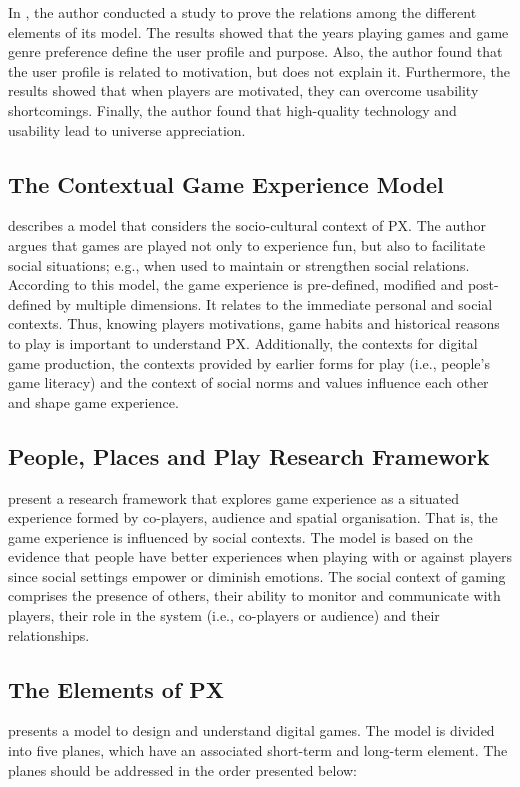 In \autocite{Fernandez}, the author conducted a study to prove the relations among the different elements of its model. The results showed that the years playing games and game genre preference define the user profile and purpose. Also, the author found that the user profile is related to motivation, but does not explain it. Furthermore, the results showed that when players are motivated, they can overcome usability shortcomings. Finally, the author found that high-quality technology and usability lead to universe appreciation.

\subsection{The Contextual Game Experience Model}
\textcite{Mayra} describes a model that considers the socio-cultural context of \ac{PX}. The author argues that games are played not only to experience fun, but also to facilitate social situations; e.g., when used to maintain or strengthen social relations. According to this model, the game experience is pre-defined, modified and post-defined by multiple dimensions. It relates to the immediate personal and social contexts. Thus, knowing players motivations, game habits and historical reasons to play is important to understand \ac{PX}. Additionally, the contexts for digital game production, the contexts provided by earlier forms for play (i.e., people's game literacy) and the context of social norms and values influence each other and shape game experience.

\subsection{People, Places and Play Research Framework}
\textcite{DeKort2007b} present a research framework that explores game experience as a situated experience formed by co-players, audience and spatial organisation. That is, the game experience is influenced by social contexts. The model is based on the evidence that people have better experiences when playing with or against players since social settings empower or diminish emotions. The social context of gaming comprises the presence of others, their ability to monitor and communicate with players, their role in the system (i.e., co-players or audience) and their relationships.

\subsection{The Elements of \ac{PX}}
\textcite{Ferrara} presents a model to design and understand digital games. The model is divided into five planes, which have an associated short-term and long-term element. The planes should be addressed in the order presented below:

